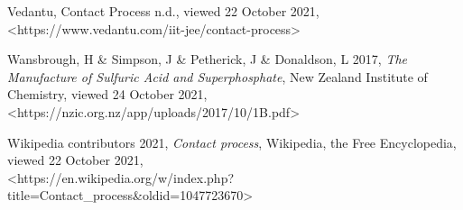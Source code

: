 \documentclass[12pt, a4paper]{article}
\begin{document}
Vedantu, Contact Process n.d., viewed 22 October 2021, \\ \textless{https://www.vedantu.com/iit-jee/contact-process}\textgreater

Wansbrough, H \& Simpson, J \& Petherick, J \& Donaldson, L 2017, \emph{The Manufacture of Sulfuric Acid and Superphosphate}, New Zealand Institute of Chemistry, viewed 24 October 2021, \\ \textless{https://nzic.org.nz/app/uploads/2017/10/1B.pdf}\textgreater

Wikipedia contributors 2021, \emph{Contact process}, Wikipedia, the Free Encyclopedia, viewed 22 October 2021, \\ \textless{https://en.wikipedia.org/w/index.php?title=Contact\_process\&oldid=1047723670}\textgreater
\end{document}
